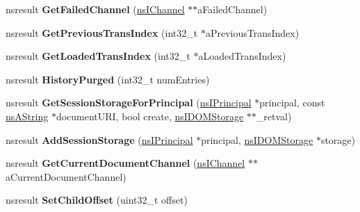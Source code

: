 \begin{DoxyCompactItemize}
\item 
\mbox{\label{interfacens_i_doc_shell_ac9f6ff4f55237c468619bf4831bd83b2}} 
nsresult {\bfseries Get\+Failed\+Channel} (\hyperlink{interfacens_i_channel}{ns\+I\+Channel} $\ast$$\ast$a\+Failed\+Channel)
\item 
\mbox{\label{interfacens_i_doc_shell_acc3d54522015217768220cf4d54f44fb}} 
nsresult {\bfseries Get\+Previous\+Trans\+Index} (int32\+\_\+t $\ast$a\+Previous\+Trans\+Index)
\item 
\mbox{\label{interfacens_i_doc_shell_aebd1206bf801c6fbf14d3a442088603e}} 
nsresult {\bfseries Get\+Loaded\+Trans\+Index} (int32\+\_\+t $\ast$a\+Loaded\+Trans\+Index)
\item 
\mbox{\label{interfacens_i_doc_shell_a979d488ea488db64e9b98aec31550141}} 
nsresult {\bfseries History\+Purged} (int32\+\_\+t num\+Entries)
\item 
\mbox{\label{interfacens_i_doc_shell_a3e0fd835247048d36de2a90f1ff8c5c2}} 
nsresult {\bfseries Get\+Session\+Storage\+For\+Principal} (\hyperlink{interfacens_i_supports}{ns\+I\+Principal} $\ast$principal, const \hyperlink{structns_string_container}{ns\+A\+String} $\ast$document\+U\+RI, bool create, \hyperlink{interfacens_i_supports}{ns\+I\+D\+O\+M\+Storage} $\ast$$\ast$\+\_\+retval)
\item 
\mbox{\label{interfacens_i_doc_shell_aa1401369cedf703d00fe5c4ee75219b9}} 
nsresult {\bfseries Add\+Session\+Storage} (\hyperlink{interfacens_i_supports}{ns\+I\+Principal} $\ast$principal, \hyperlink{interfacens_i_supports}{ns\+I\+D\+O\+M\+Storage} $\ast$storage)
\item 
\mbox{\label{interfacens_i_doc_shell_a44f51d4f65ce137caeb57b7b37af3d10}} 
nsresult {\bfseries Get\+Current\+Document\+Channel} (\hyperlink{interfacens_i_channel}{ns\+I\+Channel} $\ast$$\ast$a\+Current\+Document\+Channel)
\item 
\mbox{\label{interfacens_i_doc_shell_aff30a1e5da044abba29479eeae3d84e3}} 
nsresult {\bfseries Set\+Child\+Offset} (uint32\+\_\+t offset)
$$
\end{DoxyCompactItemize}
